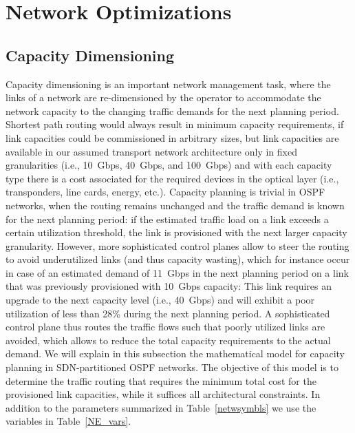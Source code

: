 \documentclass[journal]{IEEEtran}
\begin{document}
\section{Network Optimizations}\label{optimization}
\subsection{Capacity Dimensioning}\label{math_ne}
Capacity dimensioning is an important network management task, where the links of a network are re-dimensioned by the operator to accommodate the network capacity to the changing traffic demands for the next planning period. Shortest path routing would always result in minimum capacity requirements, if link capacities could be commissioned in arbitrary sizes, but link capacities are available in our assumed transport network architecture only in fixed granularities (i.e., 10~Gbps, 40~Gbps, and 100~Gbps) and with each capacity type there is a cost associated for the required devices in the optical layer (i.e., transponders, line cards, energy, etc.). Capacity planning is trivial in OSPF networks, when the routing remains unchanged and the traffic demand is known for the next planning period: if the estimated traffic load on a link exceeds a certain utilization threshold, the link is provisioned with the next larger capacity granularity. However, more sophisticated control planes allow to steer the routing to avoid underutilized links (and thus capacity wasting), which for instance occur in case of an estimated demand of 11~Gbps in the next planning period on a link that was previously provisioned with 10~Gbps capacity: This link requires an upgrade to the next capacity level (i.e., 40~Gbps) and will exhibit a poor utilization of less than 28\% during the next planning period. A sophisticated control plane thus routes the traffic flows such that poorly utilized links are avoided, which allows to reduce the total capacity requirements to the actual demand. We will explain in this subsection the mathematical model for capacity planning in SDN-partitioned OSPF networks. The objective of this model is to determine the traffic routing that requires the minimum total cost for the provisioned link capacities, while it suffices all architectural constraints. In addition to the parameters summarized in Table~\ref{netwsymbls} we use the variables in Table~\ref{NE_vars}.
\end{document}
